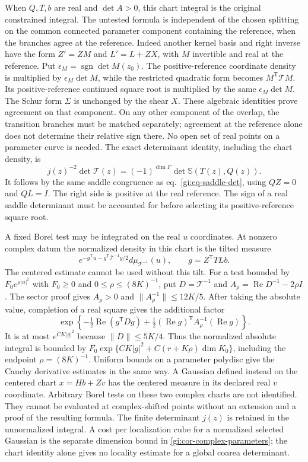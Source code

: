 \documentclass[11pt,letterpaper,reqno]{amsart}
\numberwithin{equation}{section}
\renewcommand{\eqref}[1]{\textup{eq.~\ref{#1}}}
\theoremstyle{definition}
\theoremstyle{remark}
\begin{document}
When $Q,T,b$ are real and $\det A>0$, this chart integral
is the original constrained integral. The untested
formula is independent of the chosen splitting on the common
connected parameter component containing the reference, when
the branches agree at the reference. Indeed another kernel
basis and right inverse have the form $Z'=ZM$ and
$L'=L+ZX$, with $M$ invertible and real at the reference.
Put $\epsilon_M=\operatorname{sgn}\det M(z_0)$.
The positive-reference coordinate density is multiplied by
$\epsilon_M\det M$, while the restricted quadratic form
becomes $M^{\mathsf T}\mathcal T M$. Its positive-reference
continued square root is multiplied by the same
$\epsilon_M\det M$. The
Schur form $\Sigma$ is unchanged by the shear $X$.
These algebraic identities prove agreement on that component.
On any other component of the overlap, the transition branches
must be matched separately; agreement at the reference alone
does not determine their relative sign there. No open set of
real points on a parameter curve is needed.
The exact determinant identity, including the chart density, is
\[
 j(z)^{-2}\det\mathcal T(z)
       =(-1)^{\dim F}\det\mathbb S(T(z),Q(z)).
\]
It follows by the same saddle congruence as
\eqref{gi:eq-saddle-det}, using $QZ=0$ and $QL=I$.
The right side is positive at the real reference.
The sign of a real saddle determinant must be accounted
for before selecting its positive-reference square root.

A fixed Borel test may be integrated on the real $u$
coordinates. At nonzero complex datum the normalized
density in this chart is the tilted measure
\begin{equation}\label{gi:eq-affine-tilt}
 e^{-g^{\mathsf T}u-g^{\mathsf T}\mathcal T^{-1}g/2}
                          d\mu_{\mathcal T^{-1}}(u),
 \qquad g=Z^{\mathsf T}TLb.
\end{equation}
The centered estimate cannot be used without this tilt.
For a test bounded by $F_0 e^{\rho|u|^2}$ with $F_0\ge0$ and
$0\le\rho\le(8K)^{-1}$, put $D=\mathcal T^{-1}$ and
$A_\rho=\operatorname{Re}D^{-1}-2\rho I$.
The sector proof gives $A_\rho>0$ and
$\|A_\rho^{-1}\|\le12K/5$. After taking the absolute
value, completion of a real square gives the additional
factor
\[
 \exp\!\left\{-\tfrac12\operatorname{Re}(g^{\mathsf T}Dg)
       +\tfrac12(\operatorname{Re}g)^{\mathsf T}
                     A_\rho^{-1}(\operatorname{Re}g)\right\}.
\]
It is at most $e^{CK|g|^2}$ because $\|D\|\le5K/4$.
Thus the normalized absolute integral is bounded by
$F_0\exp\{CK|g|^2+C(r+K\rho)\dim K_0\}$, including
the endpoint $\rho=(8K)^{-1}$.
Uniform bounds on a parameter polydisc give the Cauchy
derivative estimates in the same way. A Gaussian defined
instead on the centered chart $x=Hb+Zv$ has the centered
measure in its declared real $v$ coordinate. Arbitrary
Borel tests on these two complex charts are not identified.
They cannot be evaluated at complex-shifted points without
an extension and a proof of the resulting formula.
The finite determinant $j(z)$ is retained in the
unnormalized integral. A cost per localization cube for
a normalized selected Gaussian is the separate dimension
bound in \cref{gi:cor-complex-parameters}; the chart
identity alone gives no locality estimate for a global
coarea determinant.
\end{document}
